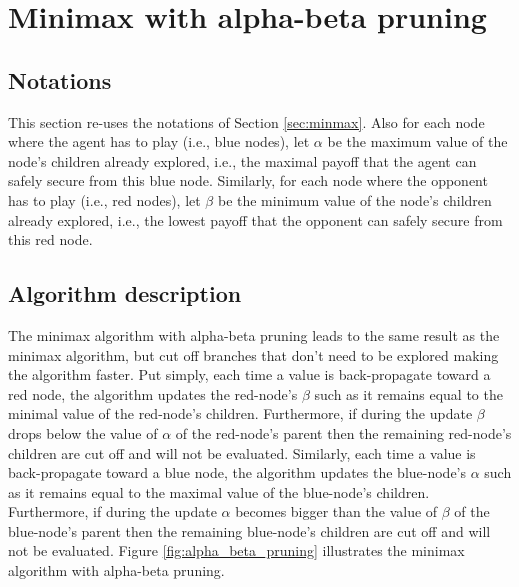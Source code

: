 \documentclass[11pt,fleqn]{book} %
\begin{document}
\section{Minimax with alpha-beta pruning}

\subsection*{Notations}

This section re-uses the notations of Section \ref{sec:minmax}. Also for each node where the agent has to play (i.e., blue nodes), let $\alpha$ be the maximum value of the node's children already explored, i.e., the maximal payoff that the agent can safely secure from this blue node. Similarly, for each node where the opponent has to play (i.e., red nodes), let $\beta$ be the minimum value of the node's children already explored, i.e., the lowest payoff that the opponent can safely secure from this red node.

\subsection*{Algorithm description}

The minimax algorithm with alpha-beta pruning leads to the same result as the minimax algorithm, but cut off branches that don't need to be explored making the algorithm faster. Put simply, each time a value is back-propagate toward a red node, the algorithm updates the red-node's $\beta$ such as it remains equal to the minimal value of the red-node's children. Furthermore, if during the update $\beta$ drops below the value of $\alpha$ of the red-node's parent then the remaining red-node's children are cut off and will not be evaluated. Similarly, each time a value is back-propagate toward a blue node, the algorithm updates the blue-node's $\alpha$ such as it remains equal to the maximal value of the blue-node's children. Furthermore, if during the update $\alpha$ becomes bigger than the value of $\beta$ of the blue-node's parent then the remaining blue-node's children are cut off and will not be evaluated. Figure \ref{fig:alpha_beta_pruning} illustrates the minimax algorithm with alpha-beta pruning.
\end{document}
